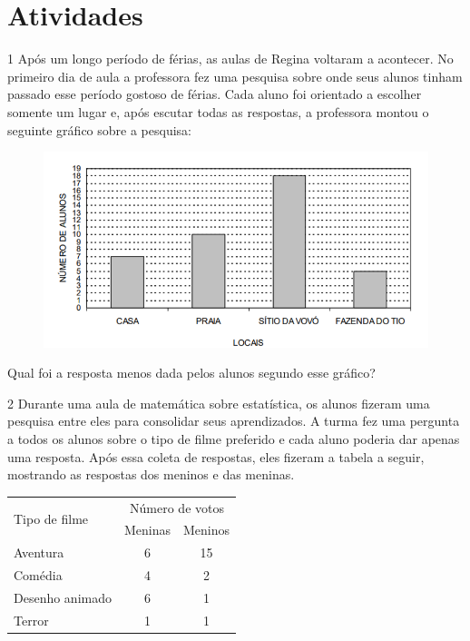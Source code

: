 \pagebreak
\section*{Atividades}

\num{1} Após um longo período de férias, as aulas de Regina voltaram a
acontecer. No primeiro dia de aula a professora fez uma pesquisa sobre
onde seus alunos tinham passado esse período gostoso de férias. Cada
aluno foi orientado a escolher somente um lugar e, após escutar todas as
respostas, a professora montou o seguinte gráfico sobre a pesquisa:

\begin{figure}[htpb!]
\includegraphics[width=\textwidth]{./imgs/mat11.png}
\end{figure}

Qual foi a resposta menos dada pelos alunos segundo esse gráfico?


\num{2} Durante uma aula de matemática sobre estatística, os alunos fizeram
uma pesquisa entre eles para consolidar seus aprendizados. A turma fez
uma pergunta a todos os alunos sobre o tipo de filme preferido e cada
aluno poderia dar apenas uma resposta. Após essa coleta de respostas,
eles fizeram a tabela a seguir, mostrando as respostas dos meninos e das meninas.

\begin{center}
\begin{tabular}{l|cc}
\hline
\multirow{2}{*}{Tipo de filme} & \multicolumn{2}{c}{Número de votos} \\ \cline{2-3} 
 & \multicolumn{1}{c|}{Meninas} & Meninos \\ \hline
Aventura & \multicolumn{1}{c|}{6} & 15 \\ \hline
Comédia & \multicolumn{1}{c|}{4} & 2 \\ \hline
Desenho animado & \multicolumn{1}{c|}{6} & 1 \\ \hline
Terror & \multicolumn{1}{c|}{1} & 1 \\ \hline
\end{tabular}
\end{center}

